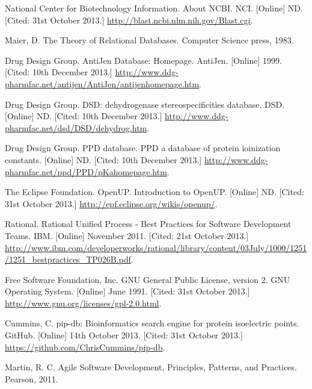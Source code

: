 \newpage
\begin{thebibliography}{9}

 National Center for Biotechnology Information. About
  NCBI. NCI. [Online] ND. [Cited: 31st October 2013.]
  \url{http://blast.ncbi.nlm.nih.gov/Blast.cgi}.

 Maier, D. The Theory of Relational Databases. Computer
  Science press, 1983.

 Drug Design Group. AntiJen Database:
  Homepage. AntiJen. [Online] 1999. [Cited: 10th December 2013.]
  \url{http://www.ddg-pharmfac.net/antijen/AntiJen/antijenhomepage.htm}.

 Drug Design Group. DSD: dehydrogenase stereospecificities
  database. DSD. [Online] ND. [Cited: 10th December 2013.]
  \url{http://www.ddg-pharmfac.net/dsd/DSD/dehydrog.htm}.

 Drug Design Group. PPD database. PPD a database of protein
  ioinization constants. [Online] ND. [Cited: 10th December 2013.]
  \url{http://www.ddg-pharmfac.net/ppd/PPD/pKahomepage.htm}.

 The Eclipse Foundation. OpenUP. Introduction to
  OpenUP. [Online] ND. [Cited: 31st October 2013.]
  \url{http://epf.eclipse.org/wikis/openup/}.

 Rational. Rational Unified Process - Best Practices for
  Software Development Teams. IBM. [Online] November 2011. [Cited: 21st October
    2013.]
  \url{http://www.ibm.com/developerworks/rational/library/content/03July/1000/1251/1251_bestpractices_TP026B.pdf}.

 Free Software Foundation, Inc. GNU General Public License,
  version 2. GNU Operating System. [Online] June 1991. [Cited: 31st October
    2013.] \url{http://www.gnu.org/licenses/gpl-2.0.html}.

 Cummins, C. pip-db: Bioinformatics search engine for
  protein isoelectric points. GitHub. [Online] 14th October 2013. [Cited: 31st
    October 2013.]  \url{https://github.com/ChrisCummins/pip-db}.

 Martin, R. C. Agile Software Development, Principles,
  Patterns, and Practices. Pearson, 2011.

\end{thebibliography}
